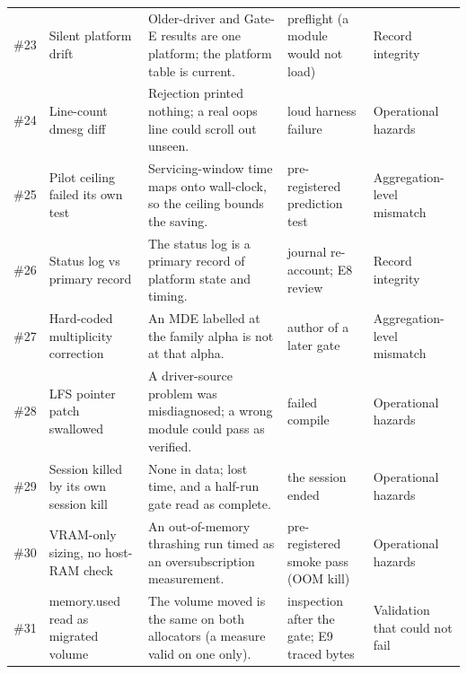 \begin{tabular}{@{}rp{2.3cm}p{4.2cm}p{2.2cm}p{2.2cm}@{}}
\#23 & Silent platform drift & Older-driver and Gate-E results are one platform; the platform table is current. & preflight (a module would not load) & Record integrity \\ %
\#24 & Line-count dmesg diff & Rejection printed nothing; a real oops line could scroll out unseen. & loud harness failure & Operational hazards \\ %
\#25 & Pilot ceiling failed its own test & Servicing-window time maps onto wall-clock, so the ceiling bounds the saving. & pre-registered prediction test & Aggregation-level mismatch \\ %
\#26 & Status log vs primary record & The status log is a primary record of platform state and timing. & journal re-account; E8 review & Record integrity \\ %
\#27 & Hard-coded multiplicity correction & An MDE labelled at the family alpha is not at that alpha. & author of a later gate & Aggregation-level mismatch \\ %
\#28 & LFS pointer patch swallowed & A driver-source problem was misdiagnosed; a wrong module could pass as verified. & failed compile & Operational hazards \\ %
\#29 & Session killed by its own session kill & None in data; lost time, and a half-run gate read as complete. & the session ended & Operational hazards \\ %
\#30 & VRAM-only sizing, no host-RAM check & An out-of-memory thrashing run timed as an oversubscription measurement. & pre-registered smoke pass (OOM kill) & Operational hazards \\ %
\#31 & memory.used read as migrated volume & The volume moved is the same on both allocators (a measure valid on one only). & inspection after the gate; E9 traced bytes & Validation that could not fail \\ %
\bottomrule
\end{tabular}
